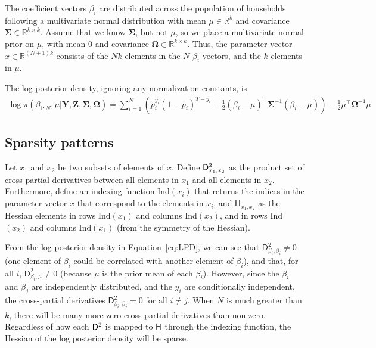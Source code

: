 \documentclass[jss]{jss}\usepackage[]{graphicx}\usepackage[]{color}
\newcommand{\parD}[3]{\mathsf{D}^{#1}_{#2}#3}
\newcommand{\hess}[2]{\mathsf{H}_{#1}#2}
\newcommand{\Mat}[1]{\mathbf{#1}}
\newcommand{\Real}[1]{\mathbb{R}^{#1}}
\begin{document}
The coefficient vectors $\beta_i$ are distributed across the population of households
following a multivariate normal distribution with mean $\mu\in\Real{k}$ and
covariance $\Mat{\Sigma}\in\Real{k\times k}$.   Assume that we know
$\Mat{\Sigma}$, but not $\mu$, so we place a multivariate normal prior
on $\mu$, with mean $0$ and
covariance $\Mat{\Omega}\in\Real{k\times k}$.  Thus, the parameter
vector $x\in\Real{(N+1)k}$ consists of the $Nk$ elements in the $N$ $\beta_i$ vectors,
and the $k$ elements in $\mu$.

The log posterior density, ignoring any normalization constants, is
\begin{align}
  \label{eq:LPD}
  \log \pi(\beta_{1:N},\mu|\Mat{Y}, \Mat{Z}, \Mat{\Sigma},\Mat{\Omega})=\sum_{i=1}^N\left(p_i^{y_i}(1-p_i)^{T-y_i}
  -\frac{1}{2}\left(\beta_i-\mu\right)^\top\Mat{\Sigma}^{-1}\left(\beta_i-\mu\right)\right)
-\frac{1}{2}\mu^\top\Mat{\Omega}^{-1}\mu
\end{align}



\subsection[Sparsity patterns]{Sparsity patterns}\label{sec:sparsity}





Let $x_1$ and $x_2$ be two subsets of elements of $x$.
Define $\parD{2}{x_1,x_2}$ as the product set of cross-partial
derivatives between all elements in $x_1$ and all elements in $x_2$.
Furthermore, define an indexing function Ind$(x_i)$ that returns the
indices in the parameter vector
$x$ that correspond to the elements in $x_i$, and $\hess{x_1,x_2}{}$
as the Hessian elements in rows Ind$(x_1)$ and columns Ind$(x_2)$, and
in rows Ind$(x_2)$ and columns Ind$(x_1)$ (from the symmetry of the
Hessian).

From the log posterior density in Equation~\ref{eq:LPD}, we can see
that $\parD{2}{\beta_i, \beta_i}\neq 0$ (one element of $\beta_i$ could be
correlated with another element of $\beta_i$), and that, for all $i$,
$\parD{2}{\beta_i, \mu}\neq 0$ (because $\mu$ is the prior mean of each
$\beta_i$).  However, since the $\beta_i$ and $\beta_j$ are independently distributed, and the $y_i$ are
conditionally independent, the cross-partial derivatives
$\parD{2}{\beta_i, \beta_j}=0$ for all $i\neq j$. When $N$ is much
greater than $k$, there will be many more zero cross-partial
derivatives than non-zero.  Regardless of how each $\parD{2}{}$ is
mapped to $\hess{}{}$ through the indexing function, the Hessian of the log
posterior density will be sparse.
\end{document}
